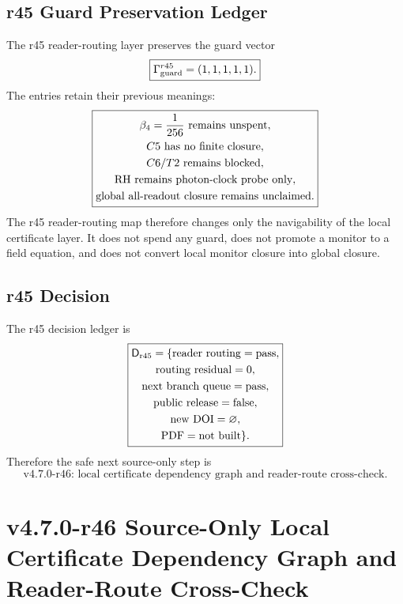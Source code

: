\subsection{r45 Guard Preservation Ledger}
\label{subsec:r45-guard-preservation-ledger}

The r45 reader-routing layer preserves the guard vector
\[
\boxed{
\Gamma_{\rm guard}^{r45}=(1,1,1,1,1).
}
\]
The entries retain their previous meanings:
\[
\boxed{
\begin{gathered}
\beta_4={1\over256}\text{ remains unspent},\\
C5\text{ has no finite closure},\\
C6/T2\text{ remains blocked},\\
\mathrm{RH}\text{ remains photon-clock probe only},\\
\text{global all-readout closure remains unclaimed}.
\end{gathered}
}
\]
The r45 reader-routing map therefore changes only the navigability of the local
certificate layer.  It does not spend any guard, does not promote a monitor to a
field equation, and does not convert local monitor closure into global closure.

\subsection{r45 Decision}
\label{subsec:r45-decision}

The r45 decision ledger is
\[
\boxed{
\begin{gathered}
\mathsf D_{\rm r45}
=
\{
\mathrm{reader\ routing}=\mathrm{pass},\\
\mathrm{routing\ residual}=0,\\
\mathrm{next\ branch\ queue}=\mathrm{pass},\\
\mathrm{public\ release}=\mathrm{false},\\
\mathrm{new\ DOI}=\varnothing,\\
\mathrm{PDF}=\mathrm{not\ built}
\}.
\end{gathered}
}
\]
Therefore the safe next source-only step is
\[
\boxed{
\text{v4.7.0-r46: local certificate dependency graph and reader-route cross-check.}
}
\]




\section{v4.7.0-r46 Source-Only Local Certificate Dependency Graph and Reader-Route Cross-Check}
\label{sec:r46-dependency-graph-route-crosscheck}

